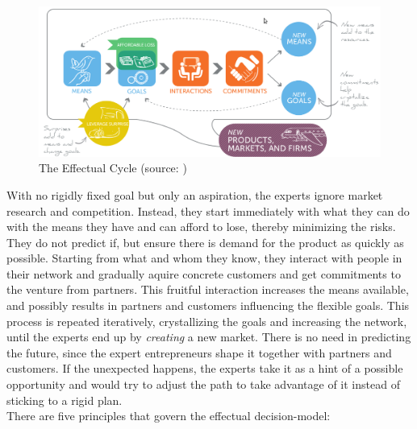 \documentclass[a4paper,10pt]{book}
\begin{document}
\begin{figure}[here]
\includegraphics[width=1.1\textwidth]{images/effectuationCycle.png}
 \caption{The Effectual Cycle (source: \cite{effectualCycle})}
\label{fig:effectualCycle}
\end{figure}


With no rigidly fixed goal but only an aspiration, the experts ignore market research and competition. Instead, they start immediately with 
what they can do with the means they have and can afford to lose, thereby minimizing the risks. 
They do not predict if, but ensure there is demand for the product as quickly as possible. 
Starting from what and whom they know, they interact with people in their network and gradually aquire concrete customers and get commitments 
to the venture from partners. 
This fruitful interaction increases the means available, and possibly results in partners and customers influencing the flexible goals. 
This process is repeated iteratively, crystallizing the goals and increasing the network, until the experts end up by \emph{creating} a new market. 
There is no need in predicting the future, since the expert entrepreneurs shape it together with partners and customers.
If the unexpected happens, the experts take it as a hint of a possible opportunity and would try to adjust the path to take advantage of it instead of sticking to a rigid plan.
\\

There are five principles that govern the effectual decision-model:
\end{document}
